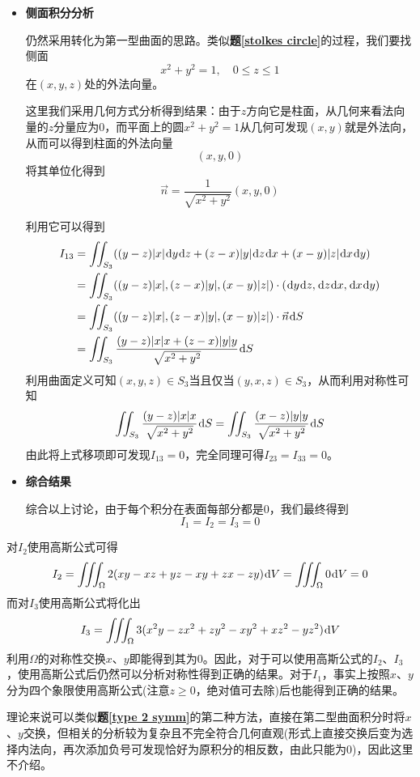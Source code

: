 \documentclass[a4paper,UTF8,fontset=windows,AutoFakeBold]{ctexart}
\newcommand*{\dr}{\hspace{0.07em}\mathrm{d}}
\newcommand*{\note}{\noindent *}
\theoremstyle{ex}
\newcommand{\exref}[1]{\textbf{题\;\ref{#1}\;}}
\begin{document}
\begin{framed}
{\begin{itemize}
        \item \textbf{侧面积分分析}
        
        仍然采用转化为第一型曲面的思路。类似\exref{stolkes circle}的过程，我们要找侧面
        $$x^2+y^2=1,\quad0\le z\le1$$
        在$(x,y,z)$处的外法向量。

        这里我们采用几何方式分析得到结果：由于$z$方向它是柱面，从几何来看法向量的$z$分量应为0，而平面上的圆$x^2+y^2=1$从几何可发现$(x,y)$就是外法向，从而可以得到柱面的外法向量
        $$(x,y,0)$$
        将其单位化得到
        $$\vec{n}=\frac{1}{\sqrt{x^2+y^2}}(x,y,0)$$

        利用它可以得到
        $$\begin{aligned}I_{13}&=\iint_{S_3}((y-z)|x|\dr y\dr z+(z-x)|y|\dr z\dr x+(x-y)|z|\dr x\dr y)\\ &=\iint_{S_3}((y-z)|x|,(z-x)|y|,(x-y)|z|)\cdot(\dr y\dr z,\dr z\dr x,\dr x\dr y)\\ &=\iint_{S_3}((y-z)|x|,(z-x)|y|,(x-y)|z|)\cdot\vec{n}\dr S\\ &=\iint_{S_3}\frac{(y-z)|x|x+(z-x)|y|y}{\sqrt{x^2+y^2}}\dr S\end{aligned}$$
        利用曲面定义可知$(x,y,z)\in S_3$当且仅当$(y,x,z)\in S_3$，从而利用对称性可知
        $$\iint_{S_3}\frac{(y-z)|x|x}{\sqrt{x^2+y^2}}\dr S=\iint_{S_3}\frac{(x-z)|y|y}{\sqrt{x^2+y^2}}\dr S$$
        由此将上式移项即可发现$I_{13}=0$，完全同理可得$I_{23}=I_{33}=0$。
        
        \item \textbf{综合结果}
        
        综合以上讨论，由于每个积分在表面每部分都是0，我们最终得到
        $$I_1=I_2=I_3=0$$
    \end{itemize}

    \note 对$I_2$使用高斯公式可得
    $$I_2=\iiint_\Omega2(xy-xz+yz-xy+zx-zy)\dr V=\iiint_\Omega0\dr V=0$$
    而对$I_3$使用高斯公式将化出
    $$I_3=\iiint_\Omega3(x^2y-zx^2+zy^2-xy^2+xz^2-yz^2)\dr V$$
    利用$\Omega$的对称性交换$x$、$y$即能得到其为0。因此，对于可以使用高斯公式的$I_2$、$I_3$，使用高斯公式后仍然可以分析对称性得到正确的结果。对于$I_1$，事实上按照$x$、$y$分为四个象限使用高斯公式(注意$z\ge0$，绝对值可去除)后也能得到正确的结果。

    \note 理论来说可以类似\exref{type 2 symm}的第二种方法，直接在第二型曲面积分时将$x$、$y$交换，但相关的分析较为复杂且不完全符合几何直观(形式上直接交换后变为选择内法向，再次添加负号可发现恰好为原积分的相反数，由此只能为0)，因此这里不介绍。
}
\end{framed}
\end{document}
